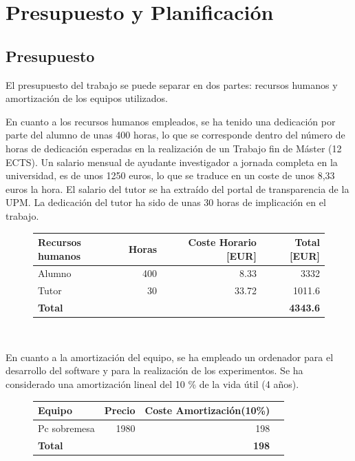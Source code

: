 \appendix
 
\chapter{Presupuesto y Planificación}

\section{Presupuesto}

El presupuesto del trabajo se puede separar en dos partes: recursos humanos y amortización de los equipos utilizados.

En cuanto a los recursos humanos empleados, se ha tenido una dedicación por parte del alumno de unas 400 horas, lo que se corresponde dentro del número de horas de dedicación esperadas en la realización de un Trabajo fin de Máster (12 ECTS). Un salario mensual de ayudante investigador a jornada completa en la universidad, es de unos 1250 euros, lo que se traduce en un coste de unos 8,33 euros la hora. El salario del tutor se ha extraído del portal de transparencia de la UPM. La dedicación del tutor ha sido de unas 30 horas de implicación en el trabajo.

\begin{figure}[htb!]
		\centering
		\begin{tabular}{|l|r|r|r|}
		\hline
		
		\textbf{Recursos humanos} & Horas &Coste Horario [EUR]&Total [EUR]\\
		\hline
		
		Alumno & 400 & 8.33 &  3332 \\
		Tutor & 30& 33.72 & 1011.6 \\
		\hline
		\textbf{Total} & &  & \textbf{4343.6}\\
		\hline
		\end{tabular}\\
	
\end{figure}


En cuanto a la amortización del equipo, se ha empleado un ordenador para el desarrollo del software y para la realización de los experimentos. Se ha considerado una amortización lineal del 10 \% de la vida útil (4 años).

\begin{figure}[htb!]
	\centering
	\begin{tabular}{|l|r|r|r|}
		\hline
		\textbf{Equipo} & Precio &Coste Amortización(10\%)\\
		\hline
		Pc sobremesa & 1980 & 198\\
		\hline
		\textbf{Total} & & \textbf{198}\\
		\hline
\end{tabular}\\
\end{figure}


